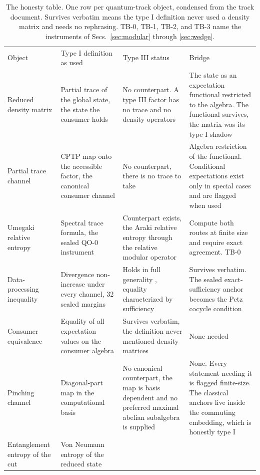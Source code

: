 \documentclass[aps,prd,reprint,nofootinbib,longbibliography]{revtex4-2}
\begin{document}
\begin{table}[t]
\caption{The honesty table.  One row per quantum-track object, condensed
from the track document.  Survives verbatim means the type I definition
never used a density matrix and needs no rephrasing.  TB-0, TB-1, TB-2,
and TB-3 name the instruments of Secs.~\ref{sec:modular} through
\ref{sec:wedge}.}
\label{tab:honesty}
\begin{ruledtabular}
\begin{tabular}{p{}p{}p{}p{}}
Object & Type I definition as used & Type III status & Bridge \\
\colrule
Reduced density matrix &
Partial trace of the global state, the state the consumer holds &
No counterpart.  A type III factor has no trace and no density operators
\cite{Witten2018} &
The state as an expectation functional restricted to the algebra.  The
functional survives, the matrix was its type I shadow \\
Partial trace channel &
CPTP map onto the accessible factor, the canonical consumer channel &
No counterpart, there is no trace to take &
Algebra restriction of the functional.  Conditional expectations exist
only in special cases and are flagged when used \\
Umegaki relative entropy &
Spectral trace formula, the sealed QO-0 instrument &
Counterpart exists, the Araki relative entropy through the relative
modular operator \cite{Araki1976} &
Compute both routes at finite size and require exact agreement.  TB-0 \\
Data-processing inequality &
Divergence non-increase under every channel, 32 sealed margins &
Holds in full generality \cite{Uhlmann1977}, equality characterized by
sufficiency \cite{Petz1986} &
Survives verbatim.  The sealed exact-sufficiency anchor becomes the Petz
cocycle condition \\
Consumer equivalence &
Equality of all expectation values on the consumer algebra &
Survives verbatim, the definition never mentioned density matrices &
None needed \\
Pinching channel &
Diagonal-part map in the computational basis &
No canonical counterpart, the map is basis dependent and no preferred
maximal abelian subalgebra is supplied &
None.  Every statement needing it is flagged finite-size.  The classical
anchors live inside the commuting embedding, which is honestly type I \\
Entanglement entropy of the cut &
Von Neumann entropy of the reduced state &

\end{tabular}
\end{ruledtabular}
\end{table}
\end{document}
